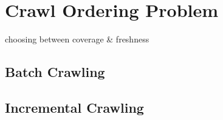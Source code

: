 \section{Crawl Ordering Problem}
choosing between coverage \& freshness

\subsection{Batch Crawling}

\subsection{Incremental Crawling}